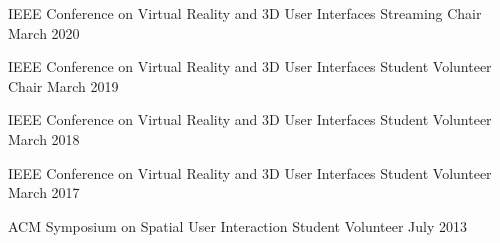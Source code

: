 \begin{cventries}
  \cventry
    {IEEE Conference on Virtual Reality and 3D User Interfaces} %
    {Streaming Chair} %
    {March 2020} %
    {} %
    {}
    \vspace{-0.15in}

  \cventry
    {IEEE Conference on Virtual Reality and 3D User Interfaces} %
    {Student Volunteer Chair} %
    {March 2019} %
    {} %
    {}
    \vspace{-0.15in}
    
  \cventry
    {IEEE Conference on Virtual Reality and 3D User Interfaces} %
    {Student Volunteer} %
    {March 2018} %
    {} %
    {}
    \vspace{-0.15in}
    
  \cventry
    {IEEE Conference on Virtual Reality and 3D User Interfaces} %
    {Student Volunteer} %
    {March 2017} %
    {} %
    {}
    \vspace{-0.15in}
    
  \cventry
    {ACM Symposium on Spatial User Interaction} %
    {Student Volunteer} %
    {July 2013} %
    {} %
    {}
    \vspace{-0.15in}
    
    
    
    
    
\end{cventries}
  \vspace{-.25cm}
  \vspace{.25cm}
  
